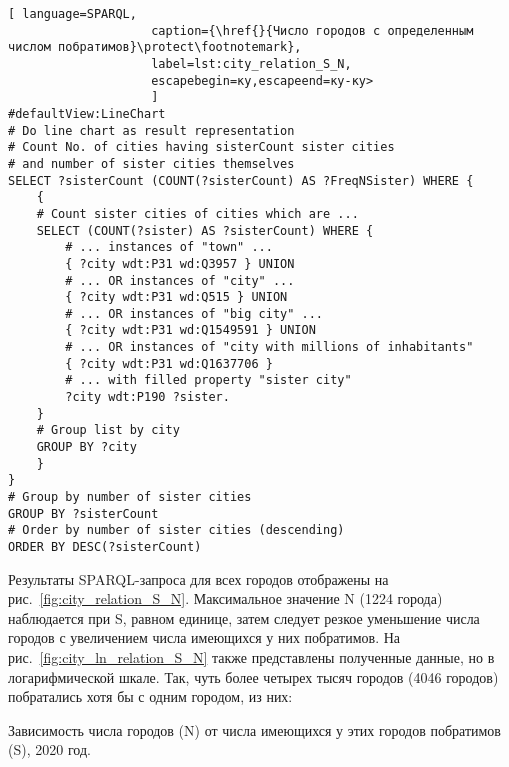 \begin{lstlisting}[ language=SPARQL, 
                    caption={\href{}{Число городов с определенным числом побратимов}\protect\footnotemark},
                    label=lst:city_relation_S_N, 
                    escapebegin=ку,escapeend=ку-ку>
                    ]
#defaultView:LineChart
# Do line chart as result representation
# Count No. of cities having sisterCount sister cities 
# and number of sister cities themselves
SELECT ?sisterCount (COUNT(?sisterCount) AS ?FreqNSister) WHERE {                                                                                                                                                       
	{
	# Count sister cities of cities which are ...
	SELECT (COUNT(?sister) AS ?sisterCount) WHERE {
		# ... instances of "town" ...                     
		{ ?city wdt:P31 wd:Q3957 } UNION    
		# ... OR instances of "city" ...                              
		{ ?city wdt:P31 wd:Q515 } UNION        
		# ... OR instances of "big city" ...                           
		{ ?city wdt:P31 wd:Q1549591 } UNION      
		# ... OR instances of "city with millions of inhabitants"                         
		{ ?city wdt:P31 wd:Q1637706 }                
		# ... with filled property "sister city"                     
		?city wdt:P190 ?sister.                                           
	}
	# Group list by city
	GROUP BY ?city                                                      
	}
}
# Group by number of sister cities
GROUP BY ?sisterCount         
# Order by number of sister cities (descending)                                           
ORDER BY DESC(?sisterCount)                                             
\end{lstlisting}

Результаты SPARQL-запроса для всех городов отображены на рис.~\ref{fig:city_relation_S_N}. Максимальное значение N (\num{1224} города) наблюдается при S, равном единице, затем следует резкое уменьшение числа городов с увеличением числа имеющихся у них побратимов. На рис.~\ref{fig:city_ln_relation_S_N} также представлены полученные данные, но в логарифмической шкале. Так, чуть более четырех тысяч городов (\num{4046} городов) побратались хотя бы с одним городом, из них:

\begin{marginfigure}[0.0cm]
{
\setlength{\fboxsep}{0pt}%
\setlength{\fboxrule}{1pt}%
}
  \caption{Зависимость числа городов (N) от числа имеющихся у этих городов побратимов (S), 2020 год.}
  \label{fig:city_relation_S_N}
\end{marginfigure}

